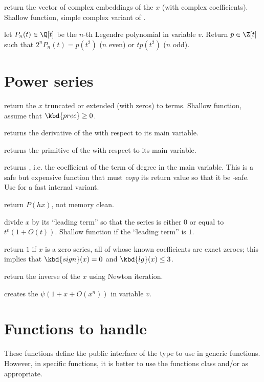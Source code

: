  return the vector of complex
embeddings of the  $x$ (with complex coefficients). Shallow
function, simple complex variant of .

 let $P_n(t)\in \Q[t]$
be the $n$-th Legendre polynomial in variable $v$. Return $p\in \Z[t]$
such that $2^n P_n(t) = p(t^2)$ ($n$ even) or $t p(t^2)$ ($n$ odd).

\section{Power series}

 return the  $x$ truncated
or extended (with zeros) to  terms. Shallow function, assume
that $\kbd{prec} \geq 0$.

 returns the derivative of the  
with respect to its main variable.

 returns the primitive of the  
with respect to its main variable.

 returns , i.e.
the coefficient of the term of degree  in the main variable. This is a
safe but expensive function that must \emph{copy} its return value so that it
be -safe. Use  for a fast internal variant.

 return $P(h x)$, not memory clean.

 divide $x$ by its ``leading term'' so that
the series is either $0$ or equal to $t^v(1+O(t))$. Shallow function if the
``leading term'' is $1$.

 return $1$ if $x$ is a zero series, all
of whose known coefficients are exact zeroes; this implies that
$\kbd{sign}(x) = 0$ and $\kbd{lg}(x) \leq 3$.

 return the inverse of the  $x$ using
Newton iteration.

 creates the 
$\psi(1 + x + O(x^n))$ in variable $v$.

\section{Functions to handle }
These functions define the public interface of the  type to use in
generic functions.  However, in specific functions, it is better to use the
functions class  and/or  as appropriate.

